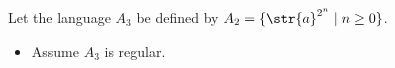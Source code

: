 Let the language $A_3$ be defined by $A_2 = \{\str{a}^{2^n} \mid n \geq 0 \}$.
\begin{itemize}
	\item Assume $A_3$ is regular.
\end{itemize}